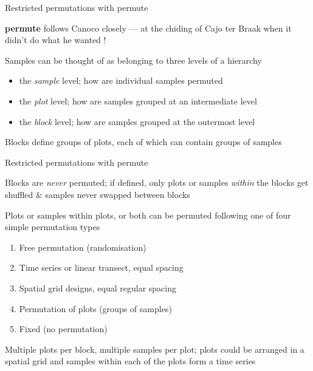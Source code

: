 \documentclass[10pt,ignorenonframetext,compress, aspectratio=169]{beamer}
\begin{document}
\begin{frame}{Restricted permutations with permute}

\textbf{permute} follows Canoco closely --- at the chiding of Cajo ter
Braak when it didn't do what he wanted !

Samples can be thought of as belonging to three levels of a hierarchy

\begin{itemize}
\itemsep1pt\parskip0pt
\item
  the \emph{sample} level; how are individual samples permuted
\item
  the \emph{plot} level; how are samples grouped at an intermediate
  level
\item
  the \emph{block} level; how are samples grouped at the outermost level
\end{itemize}

Blocks define groups of plots, each of which can contain groups of
samples

\end{frame}

\begin{frame}{Restricted permutations with permute}

Blocks are \emph{never} permuted; if defined, only plots or samples
\emph{within} the blocks get shuffled \& samples never swapped between
blocks

Plots or samples within plots, or both can be permuted following one of
four simple permutation types

\begin{enumerate}
\def\labelenumi{\arabic{enumi}.}
\itemsep1pt\parskip0pt
\item
  Free permutation (randomisation)
\item
  Time series or linear transect, equal spacing
\item
  Spatial grid designs, equal regular spacing
\item
  Permutation of plots (groups of samples)
\item
  Fixed (no permutation)
\end{enumerate}

Multiple plots per block, multiple samples per plot; plots could be
arranged in a spatial grid and samples within each of the plots form a
time series

\end{frame}
\end{document}
